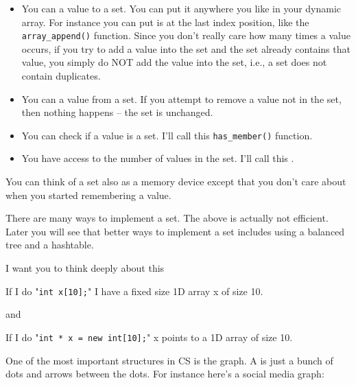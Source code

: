 \begin{itemize}
\item
  You can  a value to a set. You can put it anywhere you
  like in your dynamic array. For instance you can put is at the last
  index position, like the \texttt{array\_append()} function. Since you
  don't really care how many times a value occurs, if you try to add a
  value into the set and the set already contains that value, you simply
  do NOT add the value into the set, i.e., a set does not contain
  duplicates.
\item
  You can  a value from a set. If you attempt to remove a
  value not in the set, then nothing happens -- the set is unchanged.
\item
  You can check if a value is  a set. I'll call this
  \texttt{has\_member()} function.
\item
  You have access to the number of values in the set. I'll call this
  .
\end{itemize}

You can think of a set also as a memory device except that you don't care about when you started remembering a value.


There are many ways to implement a set. The above is actually not
efficient. Later you will see that better ways to implement a set
includes using a balanced tree and a hashtable.

\newpage{}

I want you to think deeply about this

If I do "\verb!int x[10];!" I have a fixed size 1D array x of size 10.

and

If I do "\verb!int * x = new int[10];!" x points to a 1D array of size 10.



\newpage{}

One of the most important structures in CS is the graph. A  is just a bunch of dots and arrows between the dots. For instance here's a social media graph:

